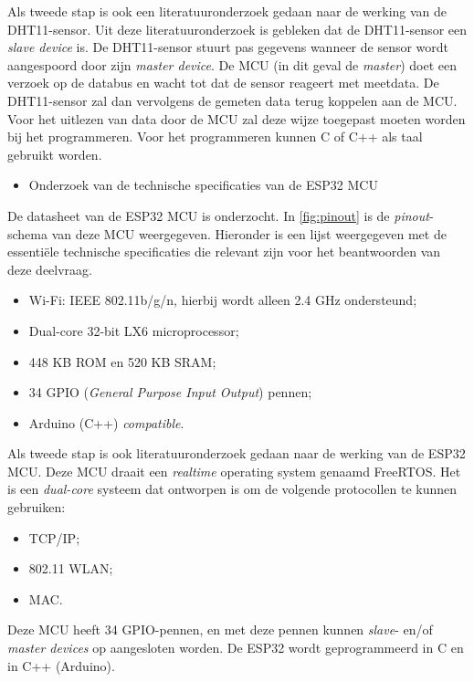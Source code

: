 Als tweede stap is ook een literatuuronderzoek gedaan naar de werking van de DHT11-sensor. 
Uit deze literatuuronderzoek \cite{G2018} is gebleken dat de DHT11-sensor een \textit{slave device} is. 
De DHT11-sensor stuurt pas gegevens wanneer de sensor wordt aangespoord door zijn \textit{master device}. 
De MCU (in dit geval de \textit{master}) doet een verzoek op de databus en wacht tot dat de sensor reageert met meetdata. 
De DHT11-sensor zal dan vervolgens de gemeten data terug koppelen aan de MCU. 
Voor het uitlezen van data door de MCU zal deze wijze toegepast moeten worden bij het programmeren. 
Voor het programmeren kunnen C of C++ als taal gebruikt worden. 
\begin{itemize}
    \item[\ding{226}] Onderzoek van de technische specificaties van de ESP32 MCU
\end{itemize}
De datasheet \cite{espressif} van de ESP32 MCU is onderzocht. In \autoref{fig:pinout} is de \textit{pinout}-schema van deze MCU weergegeven. 
Hieronder is een lijst weergegeven met de essentiële technische specificaties die relevant zijn voor het beantwoorden van deze deelvraag.
\begin{itemize}
    \item Wi-Fi: IEEE 802.11b/g/n, hierbij wordt alleen 2.4 GHz ondersteund;
    \item Dual-core 32-bit LX6 microprocessor;
    \item 448 KB ROM en 520 KB SRAM; 
    \item 34 GPIO (\textit{General Purpose Input Output}) pennen;
    \item Arduino (C++) \textit{compatible}.
\end{itemize}
Als tweede stap is ook literatuuronderzoek \cite{Maier2017} gedaan naar de werking van de ESP32 MCU. 
Deze MCU draait een \textit{realtime} operating system genaamd FreeRTOS. 
Het is een \textit{dual-core} systeem dat ontworpen is om de volgende protocollen te kunnen gebruiken:
\begin{itemize}
    \item TCP/IP;
    \item 802.11 WLAN;
    \item MAC.
\end{itemize}
Deze MCU heeft 34 GPIO-pennen, en met deze pennen kunnen \textit{slave}- en/of \textit{master devices} op aangesloten worden. 
De ESP32 wordt geprogrammeerd in C en in C++ (Arduino). 

